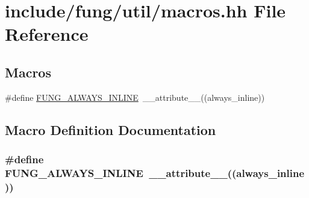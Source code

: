 \hypertarget{macros_8hh}{\section{include/fung/util/macros.hh File Reference}
\label{macros_8hh}
}
\subsection*{Macros}
\begin{DoxyCompactItemize}
\item 
\#define \hyperlink{macros_8hh_a03b9da186125795e5afa49d0ef1cc32f}{F\-U\-N\-G\-\_\-\-A\-L\-W\-A\-Y\-S\-\_\-\-I\-N\-L\-I\-N\-E}~\-\_\-\-\_\-attribute\-\_\-\-\_\-((always\-\_\-inline))
\end{DoxyCompactItemize}


\subsection{Macro Definition Documentation}
\hypertarget{macros_8hh_a03b9da186125795e5afa49d0ef1cc32f}{
\subsubsection[{F\-U\-N\-G\-\_\-\-A\-L\-W\-A\-Y\-S\-\_\-\-I\-N\-L\-I\-N\-E}]{\setlength{\rightskip}{0pt plus 5cm}\#define F\-U\-N\-G\-\_\-\-A\-L\-W\-A\-Y\-S\-\_\-\-I\-N\-L\-I\-N\-E~\-\_\-\-\_\-attribute\-\_\-\-\_\-((always\-\_\-inline))}}\label{macros_8hh_a03b9da186125795e5afa49d0ef1cc32f}
